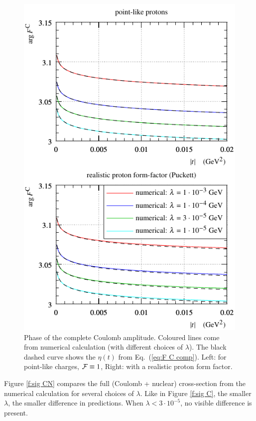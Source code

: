 \documentclass[pdftex,twocolumn,epjc3]{svjour3}
\begin{document}
\begin{figure}[h]
\begin{center}
\includegraphics{fig/coul_complete_cmp_lambda_phase.pdf}
\caption{Phase of the complete Coulomb amplitude. Coloured lines come from numerical calculation (with different choices of $\lambda$). The black dashed curve shows the $\eta(t)$ from Eq.~(\ref{eq:F C comp}). Left: for point-like charges, ${\cal F} \equiv 1$, Right: with a realistic proton form factor.}
\label{f:arg F C}
\end{center}
\end{figure}

Figure \ref{f:sig CN} compares the full (Coulomb + nuclear) cross-section from the numerical calculation for several choices of $\lambda$. Like in Figure \ref{f:sig C}, the smaller $\lambda$, the smaller difference in predictions. When $\lambda < 3\cdot 10^{-5}$, no visible difference is present.
\end{document}

